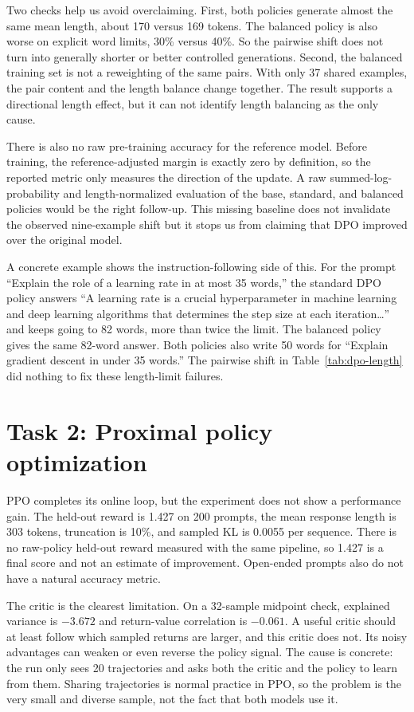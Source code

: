 \documentclass{article}
\begin{document}
Two checks help us avoid overclaiming. First, both policies generate almost the same mean length, about 170 versus 169 tokens. The balanced policy is also worse on explicit word limits, 30\% versus 40\%. So the pairwise shift does not turn into generally shorter or better controlled generations. Second, the balanced training set is not a reweighting of the same pairs. With only 37 shared examples, the pair content and the length balance change together. The result supports a directional length effect, but it can not identify length balancing as the only cause.

There is also no raw pre-training accuracy for the reference model. Before training, the reference-adjusted margin is exactly zero by definition, so the reported metric only measures the direction of the update. A raw summed-log-probability and length-normalized evaluation of the base, standard, and balanced policies would be the right follow-up. This missing baseline does not invalidate the observed nine-example shift but it stops us from claiming that DPO improved over the original model.

A concrete example shows the instruction-following side of this. For the prompt ``Explain the role of a learning rate in at most 35 words,'' the standard DPO policy answers ``A learning rate is a crucial hyperparameter in machine learning and deep learning algorithms that determines the step size at each iteration\ldots'' and keeps going to 82 words, more than twice the limit. The balanced policy gives the same 82-word answer. Both policies also write 50 words for ``Explain gradient descent in under 35 words.'' The pairwise shift in Table~\ref{tab:dpo-length} did nothing to fix these length-limit failures.

\section{Task 2: Proximal policy optimization}
PPO completes its online loop, but the experiment does not show a performance gain. The held-out reward is 1.427 on 200 prompts, the mean response length is 303 tokens, truncation is 10\%, and sampled KL is 0.0055 per sequence. There is no raw-policy held-out reward measured with the same pipeline, so 1.427 is a final score and not an estimate of improvement. Open-ended prompts also do not have a natural accuracy metric.

The critic is the clearest limitation. On a 32-sample midpoint check, explained variance is $-3.672$ and return-value correlation is $-0.061$. A useful critic should at least follow which sampled returns are larger, and this critic does not. Its noisy advantages can weaken or even reverse the policy signal. The cause is concrete: the run only sees 20 trajectories and asks both the critic and the policy to learn from them. Sharing trajectories is normal practice in PPO, so the problem is the very small and diverse sample, not the fact that both models use it.
\end{document}

